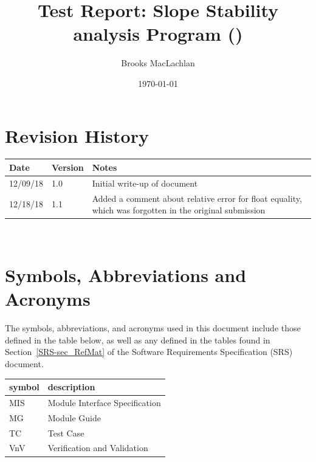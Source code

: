 \documentclass[12pt, titlepage]{article}
\begin{document}
\title{Test Report: Slope Stability analysis Program (\progname{})} 
\author{Brooks MacLachlan}
\date{\today}
	
\maketitle


\section{Revision History}

\begin{tabularx}{\textwidth}{p{3cm}p{2cm}X}
\toprule {\bf Date} & {\bf Version} & {\bf Notes}\\
\midrule
12/09/18 & 1.0 & Initial write-up of document\\
12/18/18 & 1.1 & Added a comment about relative error for float equality, which 
was forgotten in the original submission\\
\bottomrule
\end{tabularx}

~\newpage

\section{Symbols, Abbreviations and Acronyms}

The symbols, abbreviations, and acronyms used in this document include those 
defined in the table below, as well as any defined in the tables found in 
Section~\ref{SRS-sec_RefMat} of the Software Requirements Specification (SRS) 
document.
\newline

\renewcommand{\arraystretch}{1.2}
\begin{tabular}{l l} 
	\toprule		
	\textbf{symbol} & \textbf{description}\\
	\midrule
	MIS & Module Interface Specification\\
	MG & Module Guide\\
	TC & Test Case\\
	VnV & Verification and Validation\\
	\bottomrule
\end{tabular}\\

\newpage

\tableofcontents

\listoftables %
\end{document}

